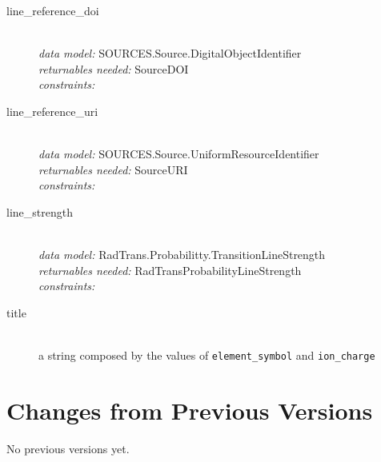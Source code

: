 \documentclass[11pt,a4paper]{ivoa}
\begin{document}
\begin{description}
\item [line\_reference\_doi]\hfill\\
	\textit{data model:} SOURCES.Source.DigitalObjectIdentifier\\
	\textit{returnables needed:} SourceDOI\\
	\textit{constraints:}

\item [line\_reference\_uri]\hfill\\
	\textit{data model:} SOURCES.Source.UniformResourceIdentifier\\
	\textit{returnables needed:} SourceURI\\
	\textit{constraints:}

\item [line\_strength]\hfill\\
	\textit{data model:} RadTrans.Probabilitty.TransitionLineStrength\\
	\textit{returnables needed:} RadTransProbabilityLineStrength\\
    \textit{constraints:}

\item [title]\hfill\\
	a string composed by the values of  \texttt{element\_symbol} and \texttt{ion\_charge}


\end{description}

\appendix
\section{Changes from Previous Versions}

No previous versions yet.



\end{document}
